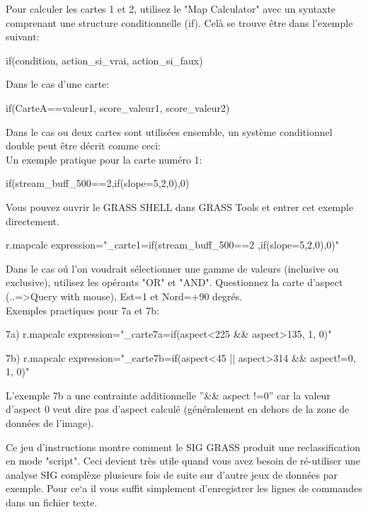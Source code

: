 Pour calculer les cartes 1 et 2, utilisez le "Map Calculator" avec un syntaxte comprenant une structure conditionnelle (if). Cel\`a se trouve \^etre dans l'exemple suivant:
\begin{smallverbatim}
if(condition, action_si_vrai, action_si_faux)
\end{smallverbatim}
Dans le cas d'une carte:
\begin{smallverbatim}
if(CarteA==valeur1, score_valeur1, score_valeur2)
\end{smallverbatim}
Dans le cas ou deux cartes sont utilis\'ees ensemble, un syst\`eme conditionnel double peut \^etre d\'ecrit comme ceci:\\

\noindent Un exemple pratique pour la carte num\'ero 1:
\begin{smallverbatim}
if(stream_buff_500==2,if(slope=5,2,0),0)
\end{smallverbatim}
\smallskip
\noindent Vous pouvez ouvrir le GRASS SHELL dans GRASS Tools et entrer cet exemple directement.
\begin{smallverbatim}
r.mapcalc expression="_carte1=if(stream_buff_500==2
          ,if(slope=5,2,0),0)"
\end{smallverbatim}

\noindent Dans le cas o\'u l'on voudrait s\'electionner une gamme de valeurs (inclusive ou exclusive), utilisez les op\'erants "OR" et "AND". Questionnez la carte d'aspect (..=>Query with mouse), Est=1 et Nord=+90 degr\'es.\\

\noindent Exemples practiques pour 7a et 7b:
\begin{smallverbatim}
7a) r.mapcalc expression="_carte7a=if(aspect<225 
          && aspect>135, 1, 0)"

7b) r.mapcalc expression="_carte7b=if(aspect<45 ||
          aspect>314 && aspect!=0, 1, 0)"
\end{smallverbatim}
L'exemple 7b a une contrainte additionnelle ''\&\& aspect !=0'' car la valeur d'aspect 0 veut dire pas d'aspect calcul\'e (g\'en\'eralement en dehors de la zone de donn\'ees de l'image).

\noindent Ce jeu d'instructions montre comment le SIG GRASS produit une reclassification en mode "script". Ceci devient tr\`es utile quand vous avez besoin de r\'e-utiliser une analyse SIG compl\`exe plusieurs fois de suite sur d'autre jeux de donn\'ees par exemple. Pour ce`a il vous suffit simplement d'enregistrer les lignes de commandes dans un fichier texte.

